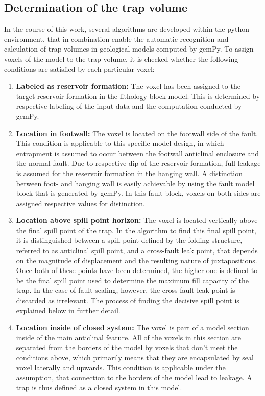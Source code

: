 		\subsection{Determination of the trap volume}
		In the course of this work, several algorithms are developed within the python environment, that in combination enable the automatic recognition and calculation of trap volumes in geological models computed by gemPy. To assign voxels of the model to the trap volume, it is checked whether the following conditions are satisfied by each particular voxel: 
		\begin{enumerate}
				        \item \textbf{Labeled as reservoir formation:} The voxel has been assigned to the target reservoir formation in the lithology block model. This is determined by respective labeling of the input data and the computation conducted by gemPy.
				        \item \textbf{Location in footwall:} The voxel is located on the footwall side of the fault. This condition is applicable to this specific model design, in which entrapment is assumed to occur between the footwall anticlinal enclosure and the normal fault. Due to respective dip of the reservoir formation, full leakage is assumed for the reservoir formation in the hanging wall. A distinction between foot- and hanging wall is easily achievable by using the fault model block that is generated by gemPy. In this fault block, voxels on both sides are assigned respective values for distinction.
				        \item \textbf{Location above spill point horizon:} The voxel is located vertically above the final spill point of the trap. In the algorithm to find this final spill point, it is distinguished between a spill point defined by the folding structure, referred to as anticlinal spill point, and a cross-fault leak point, that depends on the magnitude of displacement and the resulting nature of juxtapositions. Once both of these points have been determined, the higher one is defined to be the final spill point used to determine the maximum fill capacity of the trap. In the case of fault sealing, however, the cross-fault leak point is discarded as irrelevant. The process of finding the decisive spill point is explained below in further detail.
				        \item \textbf{Location inside of closed system:} The voxel is part of a model section inside of the main anticlinal feature. All of the voxels in this section are separated from the borders of the model by voxels that don't meet the conditions above, which primarily means that they are encapsulated by seal voxel laterally and upwards. This condition is applicable  under the assumption, that connection to the borders of the model lead to leakage. A trap is thus defined as a closed system in this model.
		\end{enumerate} 
